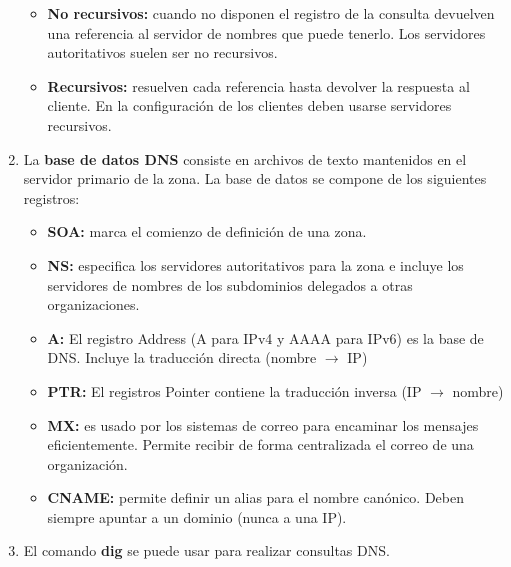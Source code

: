 \begin{enumerate}
\begin{itemize}
        \item \textbf{No recursivos: }cuando no disponen el registro de la consulta devuelven una referencia al servidor de nombres que puede tenerlo. Los servidores autoritativos suelen ser no recursivos.
        \item \textbf{Recursivos: }resuelven cada referencia hasta devolver la respuesta al cliente. En la configuración de los clientes deben usarse servidores recursivos.
    \end{itemize}
    \item La \textbf{base de datos DNS} consiste en archivos de texto  mantenidos en el servidor primario de la zona. La base de datos se compone de los siguientes registros:
    \begin{itemize}
        \item \textbf{SOA: }marca el comienzo de definición de una zona.
        \item \textbf{NS: }especifica los servidores autoritativos para la zona e incluye los servidores de nombres de los subdominios delegados a otras organizaciones.
        \item \textbf{A: }El registro Address (A para IPv4 y AAAA para IPv6) es la base de DNS. Incluye la traducción directa (nombre $\rightarrow$ IP)
        \item \textbf{PTR: }El registros Pointer contiene la traducción inversa (IP $\rightarrow$ nombre)
        \item \textbf{MX: }es usado por los sistemas de correo para encaminar los mensajes eficientemente. Permite recibir de forma centralizada el correo de una organización.
        \item \textbf{CNAME: } permite definir un alias para el nombre canónico. Deben siempre apuntar a un dominio (nunca a una IP).
    \end{itemize}
    \item El comando \textbf{dig} se puede usar para realizar consultas DNS.
\end{enumerate}

